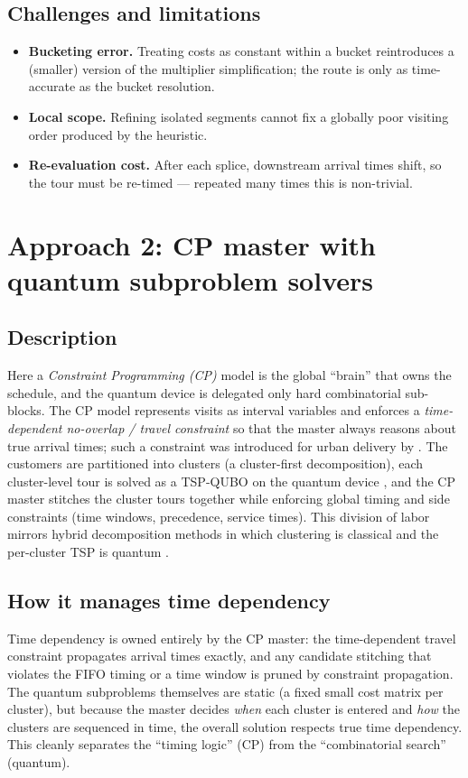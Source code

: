\documentclass[11pt]{article}
\newcommand{\emphasize}[1]{\textcolor{emphasisblue}{\textit{#1}}}
\begin{document}
\subsection{Challenges and limitations}
\begin{itemize}[leftmargin=1.4em]
  \item \textbf{Bucketing error.} Treating costs as constant within a bucket reintroduces
        a (smaller) version of the multiplier simplification; the route is only as
        time-accurate as the bucket resolution.
  \item \textbf{Local scope.} Refining isolated segments cannot fix a globally poor
        visiting order produced by the heuristic.
  \item \textbf{Re-evaluation cost.} After each splice, downstream arrival times shift, so
        the tour must be re-timed --- repeated many times this is non-trivial.
\end{itemize}

\section{Approach 2: CP master with quantum subproblem solvers}
\label{sec:approach2}

\subsection{Description}
Here a \emphasize{Constraint Programming (CP)} model is the global ``brain'' that owns the
schedule, and the quantum device is delegated only hard combinatorial sub-blocks. The CP
model represents visits as interval variables and enforces a \emphasize{time-dependent
no-overlap / travel constraint} so that the master always reasons about true arrival
times; such a constraint was introduced for urban delivery by
\citeauthor{aguiar2015time} \cite{aguiar2015time}. The customers are partitioned into
clusters (a cluster-first decomposition), each cluster-level tour is solved as a TSP-QUBO
on the quantum device \cite{feld2019hybrid,lucas2014ising}, and the CP master stitches the
cluster tours together while enforcing global timing and side constraints (time windows,
precedence, service times). This division of labor mirrors hybrid decomposition methods
in which clustering is classical and the per-cluster TSP is quantum
\cite{feld2019hybrid,holliday2025advanced}.

\subsection{How it manages time dependency}
Time dependency is owned entirely by the CP master: the time-dependent travel constraint
propagates arrival times exactly, and any candidate stitching that violates the FIFO
timing or a time window is pruned by constraint propagation. The quantum subproblems
themselves are static (a fixed small cost matrix per cluster), but because the master
decides \emph{when} each cluster is entered and \emph{how} the clusters are sequenced in
time, the overall solution respects true time dependency. This cleanly separates the
``timing logic'' (CP) from the ``combinatorial search'' (quantum).
\end{document}
